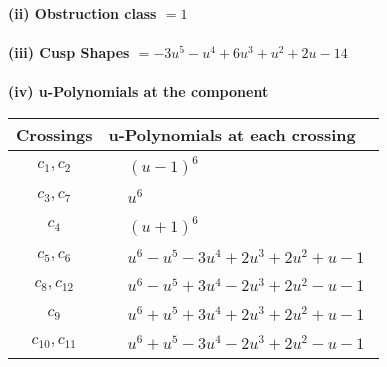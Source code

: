 \documentclass[1p]{elsarticle_modified}
\theoremstyle{definition}
\begin{document}
\flushleft \textbf{(ii) Obstruction class $= 1$}\\~\\
\flushleft \textbf{(iii) Cusp Shapes $= -3 u^5- u^4+6 u^3+u^2+2 u-14$}\\~\\
\newpage\renewcommand{\arraystretch}{1}
\flushleft \textbf{(iv) u-Polynomials at the component}\newline \\
\begin{tabular}{m{50pt}|m{274pt}}
Crossings & \hspace{64pt}u-Polynomials at each crossing \\
\hline $$\begin{aligned}c_{1},c_{2}\end{aligned}$$&$\begin{aligned}
&(u-1)^6
\end{aligned}$\\
\hline $$\begin{aligned}c_{3},c_{7}\end{aligned}$$&$\begin{aligned}
&u^6
\end{aligned}$\\
\hline $$\begin{aligned}c_{4}\end{aligned}$$&$\begin{aligned}
&(u+1)^6
\end{aligned}$\\
\hline $$\begin{aligned}c_{5},c_{6}\end{aligned}$$&$\begin{aligned}
&u^6- u^5-3 u^4+2 u^3+2 u^2+u-1
\end{aligned}$\\
\hline $$\begin{aligned}c_{8},c_{12}\end{aligned}$$&$\begin{aligned}
&u^6- u^5+3 u^4-2 u^3+2 u^2- u-1
\end{aligned}$\\
\hline $$\begin{aligned}c_{9}\end{aligned}$$&$\begin{aligned}
&u^6+u^5+3 u^4+2 u^3+2 u^2+u-1
\end{aligned}$\\
\hline $$\begin{aligned}c_{10},c_{11}\end{aligned}$$&$\begin{aligned}
&u^6+u^5-3 u^4-2 u^3+2 u^2- u-1
\end{aligned}$\\
\hline
\end{tabular}\\~\\
\end{document}
